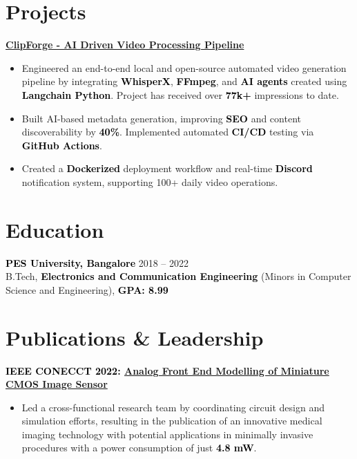 \documentclass[a4paper,10pt]{article}
\newcommand{\bb}[1]{\textcolor{black}{\textbf{#1}}}
\begin{document}
\section{Projects}
\bb{\href{https://github.com/rajathjn/shorts_maker}{ClipForge - AI Driven Video Processing Pipeline}}
\begin{itemize}[nosep, leftmargin=2em, itemsep=3pt]
    \item Engineered an end-to-end local and open-source automated video generation pipeline by integrating \bb{WhisperX}, \bb{FFmpeg}, and \bb{AI agents} created using \bb{Langchain Python}. Project has received over \bb{77k+} impressions to date.
    \item Built AI-based metadata generation, improving \bb{SEO} and content discoverability by \bb{40\%}. Implemented automated \bb{CI/CD} testing via \bb{GitHub Actions}.
    \item Created a \bb{Dockerized} deployment workflow and real-time \bb{Discord} notification system, supporting 100+ daily video operations.
\end{itemize}
\vspace{-1em}
%
%
\section{Education}
\bb{PES University, Bangalore} \hfill 2018 -- 2022 \\
B.Tech, \bb{Electronics and Communication Engineering} (Minors in Computer Science and Engineering), \bb{GPA: 8.99}
%
%
\section{Publications \& Leadership}
\bb{IEEE CONECCT 2022: \href{https://ieeexplore.ieee.org/document/9865797}{Analog Front End Modelling of Miniature CMOS Image Sensor}}
\begin{itemize}[nosep, leftmargin=2em, itemsep=3pt]
    \item Led a cross-functional research team by coordinating circuit design and simulation efforts, resulting in the publication of an innovative medical imaging technology with potential applications in minimally invasive procedures with a power consumption of just \bb{4.8 mW}.
\end{itemize}
%
%
\end{document}
